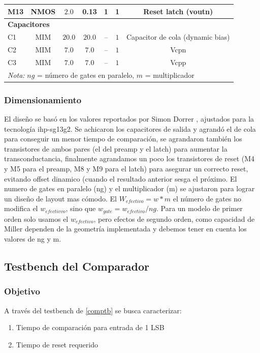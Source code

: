\documentclass[12pt,a4paper]{report}
\begin{document}
\begin{table}[h]
{\begin{tabular}{lcccccc}
M13 & NMOS & $2.0$ & 0.13 & 1 & 1 & Reset latch (voutn) \\
\midrule
\multicolumn{7}{l}{\textbf{Capacitores}} \\
\midrule
C1 & MIM & $20.0$ & $20.0$ & -- & $1$ & Capacitor de cola (dynamic bias) \\
C2 & MIM & $7.0$ & $7.0$ & -- & $1$ & Vcpn \\
C3 & MIM & $7.0$ & $7.0$ & -- & $1$ & Vcpp \\
\bottomrule
\multicolumn{7}{l}{\footnotesize \textit{Nota:} $ng$ = número de gates en paralelo, $m$ = multiplicador} \\
\end{tabular}%
}
\end{table}
\subsubsection{Dimensionamiento}

El diseño se basó en los valores reportados por Simon Dorrer \cite{dorrer}, ajustados para la tecnología ihp-sg13g2. Se achicaron los capacitores de salida y agrandó el de cola para conseguir un menor tiempo de comparación, se agrandaron también los transistores de ambos pares (el del preamp y el latch) para aumentar la transconductancia, finalmente agrandamos un poco los transistores de reset (M4 y M5 para el preamp, M8 y M9 para el latch) para asegurar un correcto reset, evitando offset dinamico (cuando el resultado anterior sesga el próximo. El numero de gates en paralelo (ng) y el multiplicador (m) se ajustaron para lograr un diseño de layout mas cómodo. El $W_{efectivo} = w*m$ el número de gates no modifica el $w_{efectivvo}$, sino que $w_{gate} = w_{efectivo}/ng$. Para un modelo de primer orden solo usamos el $w_{efectivo}$, pero efectos de segundo orden, como capacidad de Miller dependen de la geometría implementada y debemos tener en cuenta los valores de ng y m.


\subsection{Testbench del Comparador}

\subsubsection{Objetivo}
A través del testbench de \cref{comptb} se busca caracterizar:
\begin{enumerate}
    \item Tiempo de comparación para entrada de 1 LSB
    \item Tiempo de reset requerido
\end{enumerate}
\end{document}
